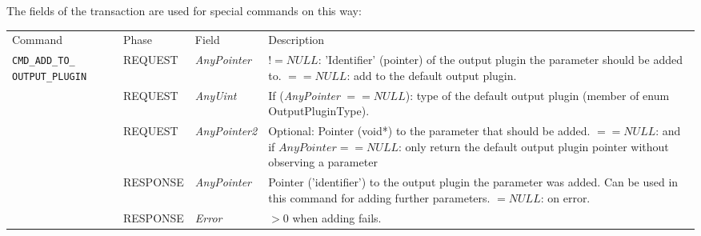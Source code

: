 The fields of the transaction are used for special commands on this way:\newline
\noindent
\begin{tabularx}{\textwidth}{|p{3.3cm}|p{2.3cm}|p{2cm}|X|}
	\cline{1-1}\cline{2-2}\cline{3-3}\cline{4-4} Command                &  Phase       &  Field             &  Description   \\ 
	\cline{1-1}\cline{2-2}\cline{3-3}\cline{4-4} \lstinline|CMD_ADD_TO_ OUTPUT_PLUGIN|&  REQUEST     &  
		{\em AnyPointer}    &  $!= NULL$: 'Identifier' (pointer) of the output plugin the parameter should be added to.
		\newline $== NULL$: add to the default output plugin.  \\ 
	\cline{1-1}\cline{2-2}\cline{3-3}\cline{4-4}                        &  REQUEST    &  {\em AnyUint}       & 
		If ({\em AnyPointer} $== NULL$): type of the default output plugin 
		(member of enum {\sffamily OutputPluginType}).  \\ 
	\cline{1-1}\cline{2-2}\cline{3-3}\cline{4-4}                        &  REQUEST    &  {\em AnyPointer2} & 
		Optional: Pointer (void*) to the parameter that should be added. \newline
		$== NULL$: and if $AnyPointer == NULL$: only return the default output plugin pointer without observing a parameter \\ 
	\cline{1-1}\cline{2-2}\cline{3-3}\cline{4-4}                        &  RESPONSE  &  {\em AnyPointer} & 
		Pointer ('identifier') to the output plugin the parameter was added. 
		Can be used in this command for adding further parameters. \newline 
		$= NULL$: on error. \\ 
	\cline{1-1}\cline{2-2}\cline{3-3}\cline{4-4}                        &  RESPONSE  &  {\em Error}       & 
		 $>0$ when adding fails.   \\ 
	\hline
\end{tabularx}

\vspace{1 cm}

